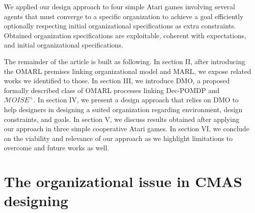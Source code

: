 \documentclass[runningheads]{llncs}
\begin{document}

We applied our design approach to four simple Atari games involving several agents that must converge to a specific organization to achieve a goal efficiently optionally respecting initial organizational specifications as extra constraints. Obtained organization specifications are exploitable, coherent with expectations, and initial organizational specifications.

The remainder of the article is built as following.
In section II, after introducing the OMARL premises linking organizational model and MARL, we expose related works we identified to those.
In section III, we introduce DMO, a proposed formally described class of OMARL processes linking Dec-POMDP and $\mathcal{M}OISE^+$.
In section IV, we present a design approach that relies on DMO to help designers in designing a suited organization regarding environment, design constraints, and goals.
In section V, we discuss results obtained after applying our approach in three simple cooperative Atari games.
In section VI, we conclude on the viability and relevance of our approach as we highlight limitations to overcome and future works as well.

\section{The organizational issue in CMAS designing}

\end{document}
